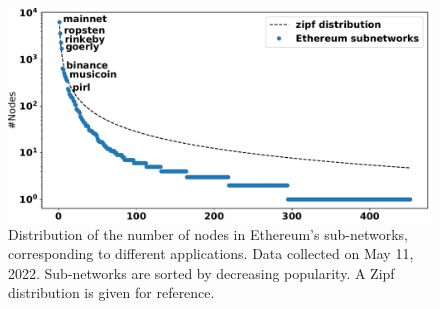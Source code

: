 \begin{figure}[t]
    \includegraphics[width=1\linewidth]{img/ecosystem}
    \caption{Distribution of the number of nodes in Ethereum's sub-networks, corresponding to different applications.
    Data collected on May 11, 2022.
    Sub-networks are sorted by decreasing popularity.
    A Zipf distribution is given for reference.
    \protect{}
    }
    \label{fig:ecosystem}
\end{figure}

